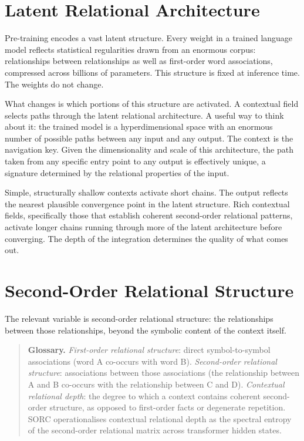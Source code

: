 \documentclass[12pt]{article}
\begin{document}
\section{Latent Relational
Architecture}\label{latent-relational-architecture}

Pre-training encodes a vast latent structure. Every weight in a trained
language model reflects statistical regularities drawn from an enormous
corpus: relationships between relationships as well as first-order word
associations, compressed across billions of parameters. This structure
is fixed at inference time. The weights do not change.

What changes is which portions of this structure are activated. A
contextual field selects paths through the latent relational
architecture. A useful way to think about it: the trained model is a
hyperdimensional space with an enormous number of possible paths between
any input and any output. The context is the navigation key. Given the
dimensionality and scale of this architecture, the path taken from any
specific entry point to any output is effectively unique, a signature
determined by the relational properties of the input.

Simple, structurally shallow contexts activate short chains. The output
reflects the nearest plausible convergence point in the latent
structure. Rich contextual fields, specifically those that establish
coherent second-order relational patterns, activate longer chains
running through more of the latent architecture before converging. The
depth of the integration determines the quality of what comes out.

\section{Second-Order Relational
Structure}\label{second-order-relational-structure}

The relevant variable is second-order relational structure: the
relationships between those relationships, beyond the symbolic content
of the context itself.

\begin{quote}
\textbf{Glossary.} \textit{First-order relational structure}: direct symbol-to-symbol associations (word A co-occurs with word B). \textit{Second-order relational structure}: associations between those associations (the relationship between A and B co-occurs with the relationship between C and D). \textit{Contextual relational depth}: the degree to which a context contains coherent second-order structure, as opposed to first-order facts or degenerate repetition. SORC operationalises contextual relational depth as the spectral entropy of the second-order relational matrix across transformer hidden states.
\end{quote}
\end{document}
